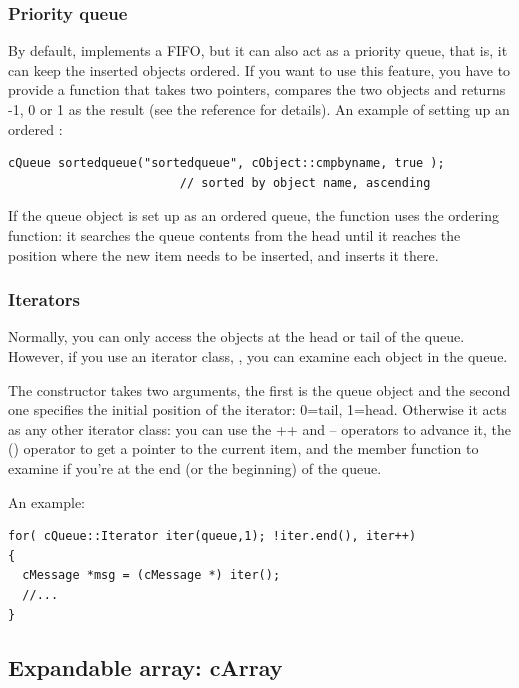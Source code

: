 \subsubsection{Priority queue}


By default,  implements a FIFO, but it can also act as
a priority queue, that is, it can keep the inserted objects
ordered.  If you want to use this feature, you have
to provide a function that takes two  pointers,
compares the two objects and returns -1, 0 or 1 as the result (see the
reference for details).  An example of setting up an ordered
:

\begin{verbatim}
cQueue sortedqueue("sortedqueue", cObject::cmpbyname, true );
                        // sorted by object name, ascending
\end{verbatim}


If the queue object is set up as an ordered queue, the 
function uses the ordering function: it searches the queue contents
from the head until it reaches the position where the new item
needs to be inserted, and inserts it there.


\subsubsection{Iterators}


Normally, you can only access the objects at the head or tail of the
queue. However, if you use an iterator class, ,
you can examine each object in the queue.

The  constructor takes two arguments, the first
is the queue object and the second one specifies the initial position
of the iterator: 0=tail, 1=head. Otherwise it acts as any other
{\opp} iterator class: you can use the ++ and -- operators to advance
it, the () operator to get a pointer to the current item, and the
 member function to examine if you're at the end (or the
beginning) of the queue.


An example:

\begin{verbatim}
for( cQueue::Iterator iter(queue,1); !iter.end(), iter++)
{
  cMessage *msg = (cMessage *) iter();
  //...
}
\end{verbatim}




\subsection{Expandable array: cArray}

